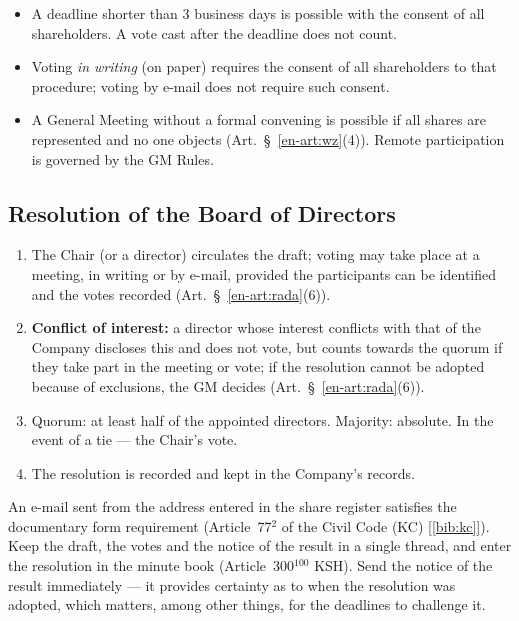 \documentclass[11pt,a4paper]{report}
\newcommand{\Zr}[1]{[\ref{bib:#1}]}
\begin{document}
\begin{itemize}
  \item A deadline shorter than 3 business days is possible with the consent of all shareholders. A vote cast after the deadline does not count.
  \item Voting \emph{in writing} (on paper) requires the consent of all shareholders to that procedure; voting by e-mail does not require such consent.
  \item A General Meeting without a formal convening is possible if all shares are represented and no one objects (Art.~\S~\ref{en-art:wz}(4)). Remote participation is governed by the GM Rules.
\end{itemize}

\subsection*{Resolution of the Board of Directors}

\begin{enumerate}
  \item The Chair (or a director) circulates the draft; voting may take place at a meeting, in writing or by e-mail, provided the participants can be identified and the votes recorded (Art.~\S~\ref{en-art:rada}(6)).
  \item \textbf{Conflict of interest:} a director whose interest conflicts with that of the Company discloses this and does not vote, but counts towards the quorum if they take part in the meeting or vote; if the resolution cannot be adopted because of exclusions, the GM decides (Art.~\S~\ref{en-art:rada}(6)).
  \item Quorum: at least half of the appointed directors. Majority: absolute. In the event of a tie --- the Chair's vote.
  \item The resolution is recorded and kept in the Company's records.
\end{enumerate}

\begin{Komentarz}
An e-mail sent from the address entered in the share register satisfies the documentary form requirement (Article~77$^{2}$ of the Civil Code (KC) \Zr{kc}). Keep the draft, the votes and the notice of the result in a single thread, and enter the resolution in the minute book (Article~300$^{100}$ KSH). Send the notice of the result immediately --- it provides certainty as to when the resolution was adopted, which matters, among other things, for the deadlines to challenge it.
\end{Komentarz}
\end{document}
